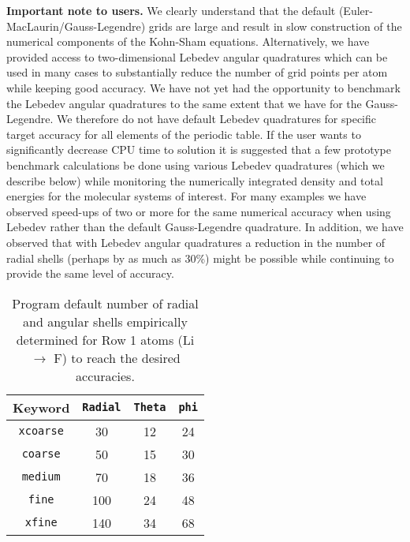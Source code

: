 {\bf Important note to users.}  We clearly understand that the default
(Euler-MacLaurin/Gauss-Legendre) grids are large and result in slow
construction of the numerical components of the Kohn-Sham equations.
Alternatively, we have provided access to two-dimensional Lebedev
angular quadratures which can be used in many cases to substantially
reduce the number of grid points per atom while keeping good accuracy.
We have not yet had the opportunity to benchmark the Lebedev angular
quadratures to the same extent that we have for the Gauss-Legendre.
We therefore do not have default Lebedev quadratures for specific
target accuracy for all elements of the periodic table.  If the user
wants to significantly decrease CPU time to solution it is suggested
that a few prototype benchmark calculations be done using various
Lebedev quadratures (which we describe below) while monitoring the
numerically integrated density and total energies for the molecular
systems of interest.  For many examples we have observed speed-ups of
two or more for the same numerical accuracy when using Lebedev rather
than the default Gauss-Legendre quadrature.  In addition, we have
observed that with Lebedev angular quadratures a reduction in the
number of radial shells (perhaps by as much as 30\%) might be possible
while continuing to provide the same level of accuracy.


\begin{table}[h]
\begin{center}
\caption{Program default number of radial and angular shells empirically determined for Row 1 atoms
  (Li $\rightarrow$ F) to reach the desired accuracies.}

\vspace{.2in}

  \begin{tabular}[right]{|c|c|c|c|} \hline
Keyword & {\tt Radial} & {\tt Theta} & {\tt phi} \\ \hline
{\tt xcoarse} & 30 & 12 & 24  \\ \hline
{\tt coarse}  & 50 & 15 & 30  \\ \hline
{\tt medium}  & 70 & 18 & 36  \\ \hline
{\tt fine}    &100 & 24 & 48  \\ \hline
{\tt xfine}   &140 & 34 & 68  \\ \hline
  \end{tabular} \\
\end{center}
\end{table}

